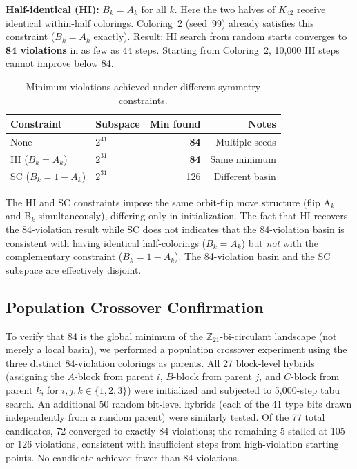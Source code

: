 \documentclass[11pt]{article}
\begin{document}
\textbf{Half-identical (HI):} $B_k = A_k$ for all $k$.
Here the two halves of $K_{42}$ receive identical within-half colorings.
Coloring~2 (seed~99) already satisfies this constraint ($B_k=A_k$ exactly).
Result: HI search from random starts converges to \textbf{84 violations} in
as few as 44 steps. Starting from Coloring~2, 10,000 HI steps cannot improve
below 84.

\begin{table}[h]
\centering
\begin{tabular}{llrr}
\toprule
Constraint & Subspace & Min found & Notes \\
\midrule
None & $2^{41}$ & \textbf{84} & Multiple seeds \\
HI ($B_k = A_k$) & $2^{31}$ & \textbf{84} & Same minimum \\
SC ($B_k = 1{-}A_k$) & $2^{31}$ & 126 & Different basin \\
\bottomrule
\end{tabular}
\caption{Minimum violations achieved under different symmetry constraints.}
\label{tab:constraints}
\end{table}

The HI and SC constraints impose the same orbit-flip move structure
(flip A$_k$ and B$_k$ simultaneously), differing only in initialization.
The fact that HI recovers the 84-violation result while SC does not
indicates that the 84-violation basin is consistent with having identical
half-colorings ($B_k = A_k$) but \emph{not} with the complementary constraint
($B_k = 1-A_k$). The 84-violation basin and the SC subspace are effectively disjoint.

\subsection{Population Crossover Confirmation}

To verify that 84 is the global minimum of the $\mathbb{Z}_{21}$-bi-circulant
landscape (not merely a local basin), we performed a population crossover
experiment using the three distinct 84-violation colorings as parents.
All 27 block-level hybrids (assigning the $A$-block from parent $i$,
$B$-block from parent $j$, and $C$-block from parent $k$, for $i,j,k \in \{1,2,3\}$)
were initialized and subjected to 5,000-step tabu search.
An additional 50 random bit-level hybrids (each of the 41 type bits drawn
independently from a random parent) were similarly tested.
Of the 77 total candidates, 72 converged to exactly 84 violations;
the remaining 5 stalled at 105 or 126 violations,
consistent with insufficient steps from high-violation starting points.
No candidate achieved fewer than 84 violations.
\end{document}
